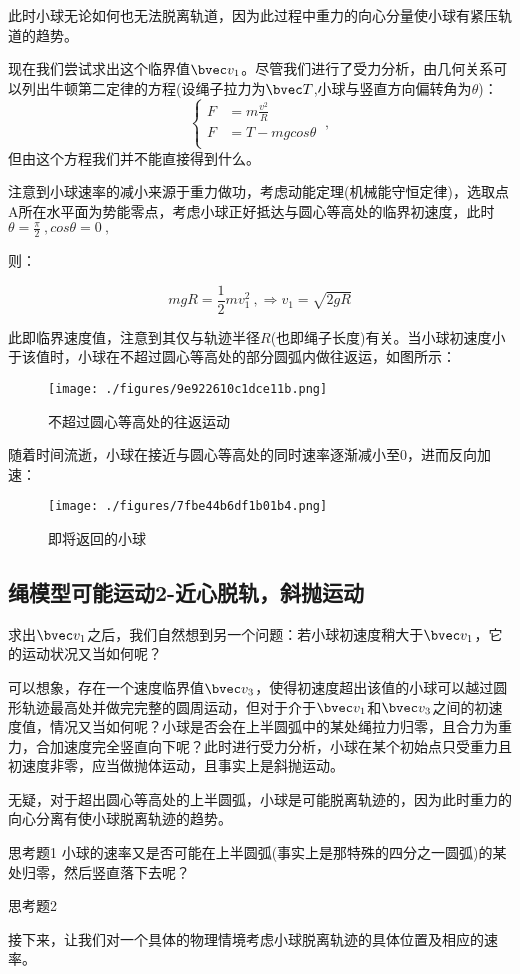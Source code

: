 此时小球无论如何也无法脱离轨道，因为此过程中重力的向心分量使小球有紧压轨道的趋势。

现在我们尝试求出这个临界值$\bvec v_1$。尽管我们进行了受力分析，由几何关系可以列出牛顿第二定律的方程(设绳子拉力为$\bvec T$,小球与竖直方向偏转角为$\theta$)：
$$
\left \{
\begin{aligned}
F&=m\frac{v^2}{R}\\
F&=T-mg cos \theta \\
\end{aligned}
\right.
~,
$$
但由这个方程我们并不能直接得到什么。

注意到小球速率的减小来源于重力做功，考虑动能定理(机械能守恒定律)，选取点A所在水平面为势能零点，考虑小球正好抵达与圆心等高处的临界初速度，此时
$\theta=\frac{\pi }{2}~, cos \theta=0~,$

则：

\begin{equation}
mgR = \frac12 mv_1^2 ~,
\Rightarrow 
v_1=\sqrt{2gR}
\end{equation}

此即临界速度值，注意到其仅与轨迹半径$R$(也即绳子长度)有关。当小球初速度小于该值时，小球在不超过圆心等高处的部分圆弧内做往返运，如图所示：
\begin{figure}[ht]
\centering
\texttt{[image: ./figures/9e922610c1dce11b.png]}
\caption{不超过圆心等高处的往返运动} \label{fig_CirVer_2}
\end{figure}

随着时间流逝，小球在接近与圆心等高处的同时速率逐渐减小至0，进而反向加速：

\begin{figure}[ht]
\centering
\texttt{[image: ./figures/7fbe44b6df1b01b4.png]}
\caption{即将返回的小球} \label{fig_CirVer_1}
\end{figure}

\subsection{绳模型可能运动2-近心脱轨，斜抛运动}
求出$\bvec v_1$之后，我们自然想到另一个问题：若小球初速度稍大于$\bvec v_1$，它的运动状况又当如何呢？

可以想象，存在一个速度临界值$\bvec v_3$，使得初速度超出该值的小球可以越过圆形轨迹最高处并做完完整的圆周运动，但对于介于$\bvec v_1$和$\bvec v_3$之间的初速度值，情况又当如何呢？小球是否会在上半圆弧中的某处绳拉力归零，且合力为重力，合加速度完全竖直向下呢？此时进行受力分析，小球在某个初始点只受重力且初速度非零，应当做抛体运动，且事实上是斜抛运动。

无疑，对于超出圆心等高处的上半圆弧，小球是可能脱离轨迹的，因为此时重力的向心分离有使小球脱离轨迹的趋势。

\begin{exercise}{思考题1}
小球的速率又是否可能在上半圆弧(事实上是那特殊的四分之一圆弧)的某处归零，然后竖直落下去呢？
\end{exercise}

\begin{exercise}{思考题2}

\end{exercise}

接下来，让我们对一个具体的物理情境考虑小球脱离轨迹的具体位置及相应的速率。